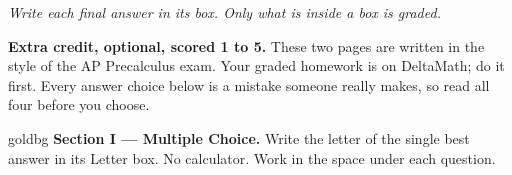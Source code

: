 \documentclass[10pt]{article}
\begin{document}
{\small\itshape Write each final answer in its box. Only what is inside a box is graded.}\par

\vspace{0.08in}

\begin{remindbox}
\small
\textbf{Extra credit, optional, scored 1 to 5.} These two pages are written in the style of the
AP Precalculus exam. Your graded homework is on DeltaMath; do it first. Every answer choice
below is a mistake someone really makes, so read all four before you choose.
\end{remindbox}

\vspace{0.08in}

\begin{headlinebox}{goldbg}
\small
\textbf{Section I --- Multiple Choice.} Write the letter of the single best answer in its
Letter box. No calculator. Work in the space under each question.
\end{headlinebox}

\vspace{0.04in}
\end{document}
